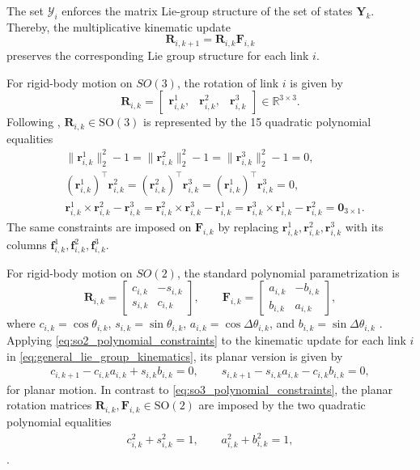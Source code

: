 The set \(\mathcal Y_i\) enforces the matrix Lie-group structure of the set of states $\bm{Y}_k$. 
Thereby, the multiplicative kinematic update 
\begin{equation}
\bm{R}_{i,k+1}=\bm{R}_{i,k}\bm{F}_{i,k}
\label{eq:general_lie_group_kinematics}
\end{equation}
preserves the corresponding Lie group structure for each link \(i\). 

For rigid-body motion on $SO(3)$, 
the rotation of link \(i\) is given by
\[
\bm{R}_{i,k}=
\begin{bmatrix}
\bm{r}^{1}_{i,k},&\bm{r}^{2}_{i,k},&\bm{r}^{3}_{i,k}
\end{bmatrix}
\in\mathbb R^{3\times3}.
\]
Following \cite{Sangli2025}, 
$\bm{R}_{i,k} \in \mathrm{SO}(3)$ is represented by the 
15 quadratic polynomial equalities
\begin{align}
&\|\bm{r}^{1}_{i,k}\|_2^2-1
=
\|\bm{r}^{2}_{i,k}\|_2^2-1
=
\|\bm{r}^{3}_{i,k}\|_2^2-1
=0,\nonumber\\
&(\bm{r}^{1}_{i,k})^\top \bm{r}^{2}_{i,k}
=
(\bm{r}^{2}_{i,k})^\top \bm{r}^{3}_{i,k}
=
(\bm{r}^{1}_{i,k})^\top \bm{r}^{3}_{i,k}
=0,
\label{eq:so3_polynomial_constraints}\\
&\bm{r}^{1}_{i,k}\times \bm{r}^{2}_{i,k}-\bm{r}^{3}_{i,k}
=
\bm{r}^{2}_{i,k}\times \bm{r}^{3}_{i,k}-\bm{r}^{1}_{i,k}
=
\bm{r}^{3}_{i,k}\times \bm{r}^{1}_{i,k}-\bm{r}^{2}_{i,k}
=\bm{0}_{3\times1}.
\nonumber
\end{align}
The same constraints are imposed on \(\bm{F}_{i,k}\) by replacing
\(\bm{r}^{1}_{i,k},\bm{r}^{2}_{i,k},\bm{r}^{3}_{i,k}\) with its columns
\(\bm{f}^{1}_{i,k},\bm{f}^{2}_{i,k},\bm{f}^{3}_{i,k}\).

For rigid-body motion on $SO(2)$, the standard polynomial parametrization is
\begin{equation}\label{eq:rotation_matrices_so2_R_and_F}
\bm{R}_{i,k}=
\begin{bmatrix}
c_{i,k}&-s_{i,k}\\
s_{i,k}&c_{i,k}
\end{bmatrix},
\qquad
\bm{F}_{i,k}=
\begin{bmatrix}
a_{i,k}&-b_{i,k}\\
b_{i,k}&a_{i,k}
\end{bmatrix},
\end{equation}
where \(c_{i,k}=\cos\theta_{i,k}\), \(s_{i,k}=\sin\theta_{i,k}\), \(a_{i,k}=\cos\Delta\theta_{i,k}\), and \(b_{i,k}=\sin\Delta\theta_{i,k}\) \cite{Hall2000LieGroups}. 
Applying \eqref{eq:so2_polynomial_constraints} 
to the kinematic update for each link \(i\) in \eqref{eq:general_lie_group_kinematics},
its planar version is given by
\begin{align}
c_{i,k+1}-c_{i,k}a_{i,k}+s_{i,k}b_{i,k}=0,
\qquad
s_{i,k+1}-s_{i,k}a_{i,k}-c_{i,k}b_{i,k}=0,
\end{align}
for planar motion. In contrast to \eqref{eq:so3_polynomial_constraints}, the planar rotation matrices
\(\bm{R}_{i,k},\bm{F}_{i,k} \in \mathrm{SO}(2)\) are imposed by the two quadratic polynomial equalities
\begin{align}\label{eq:so2_polynomial_constraints}
c_{i,k}^2+s_{i,k}^2=1,
\qquad
a_{i,k}^2+b_{i,k}^2=1, 
\end{align}
\cite{Sangli2025}.

